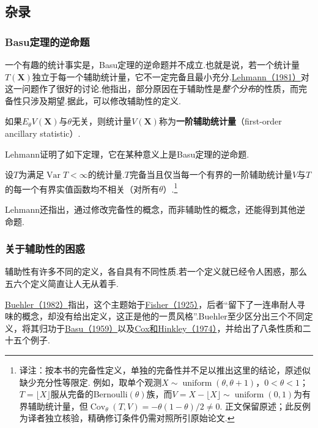 \subsection{杂录}\label{sec:6.6}
\subsubsection{Basu定理的逆命题}\label{sec:6.6.1}
一个有趣的统计事实是，Basu定理的逆命题并不成立.也就是说，若一个统计量$T(\boldsymbol X)$独立于每一个辅助统计量，它不一定完备且最小充分.\hyperref[bib:source197]{Lehmann（1981）}对这一问题作了很好的讨论.他指出，部分原因在于辅助性是\emph{整个分布}的性质，而完备性只涉及期望.据此，可以修改辅助性的定义.
\begin{definition}\label{def:6.6.1}
如果$E_\theta V(\boldsymbol X)$与$\theta$无关，则统计量$V(\boldsymbol X)$称为\textbf{一阶辅助统计量}（first-order ancillary statistic）.
\end{definition}
Lehmann证明了如下定理，它在某种意义上是Basu定理的逆命题.
\begin{theorem}\label{thm:6.6.2}
设$T$为满足$\operatorname{Var}T<\infty$的统计量.$T$完备当且仅当每一个有界的一阶辅助统计量$V$与$T$的每一个有界实值函数均不相关（对所有$\theta$）.\footnote{译注：按本书的完备性定义，单独的完备性并不足以推出这里的结论，原述似缺少充分性等限定. 例如，取单个观测$X\sim\operatorname{uniform}(\theta,\theta+1)$，$0<\theta<1$；$T=\lfloor X\rfloor$服从完备的Bernoulli$(\theta)$族，而$V=X-\lfloor X\rfloor\sim\operatorname{uniform}(0,1)$为有界辅助统计量，但$\operatorname{Cov}_\theta(T,V)=-\theta(1-\theta)/2\ne0$. 正文保留原述；此反例为译者独立核验，精确修订条件仍需对照所引原始论文.}
\end{theorem}
Lehmann还指出，通过修改完备性的概念，而非辅助性的概念，还能得到其他逆命题.
\subsubsection{关于辅助性的困惑}\label{sec:6.6.2}
辅助性有许多不同的定义，各自具有不同性质.若一个定义就已经令人困惑，那么五六个定义简直让人无从着手.

\hyperref[bib:source56]{Buehler（1982）}指出，这个主题始于\hyperref[bib:source123]{Fisher（1925）}，后者“留下了一连串耐人寻味的概念，却没有给出定义，这正是他的一贯风格”.Buehler至少区分出三个不同定义，将其归功于\hyperref[bib:source13]{Basu（1959）}以及\hyperref[bib:source86]{Cox和Hinkley（1974）}，并给出了八条性质和二十五个例子.

